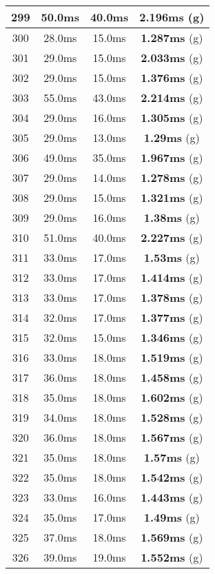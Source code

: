 \begin{table}[H]
\begin{minipage}{5cm}
{\begin{tabular}{|c|c|c|c|}
\hline
299 & 50.0ms & 40.0ms & \textbf{2.196ms} (g) \\
\hline
300 & 28.0ms & 15.0ms & \textbf{1.287ms} (g) \\
\hline
301 & 29.0ms & 15.0ms & \textbf{2.033ms} (g) \\
\hline
302 & 29.0ms & 15.0ms & \textbf{1.376ms} (g) \\
\hline
303 & 55.0ms & 43.0ms & \textbf{2.214ms} (g) \\
\hline
304 & 29.0ms & 16.0ms & \textbf{1.305ms} (g) \\
\hline
305 & 29.0ms & 13.0ms & \textbf{1.29ms} (g) \\
\hline
306 & 49.0ms & 35.0ms & \textbf{1.967ms} (g) \\
\hline
307 & 29.0ms & 14.0ms & \textbf{1.278ms} (g) \\
\hline
308 & 29.0ms & 15.0ms & \textbf{1.321ms} (g) \\
\hline
309 & 29.0ms & 16.0ms & \textbf{1.38ms} (g) \\
\hline
310 & 51.0ms & 40.0ms & \textbf{2.227ms} (g) \\
\hline
311 & 33.0ms & 17.0ms & \textbf{1.53ms} (g) \\
\hline
312 & 33.0ms & 17.0ms & \textbf{1.414ms} (g) \\
\hline
313 & 33.0ms & 17.0ms & \textbf{1.378ms} (g) \\
\hline
314 & 32.0ms & 17.0ms & \textbf{1.377ms} (g) \\
\hline
315 & 32.0ms & 15.0ms & \textbf{1.346ms} (g) \\
\hline
316 & 33.0ms & 18.0ms & \textbf{1.519ms} (g) \\
\hline
317 & 36.0ms & 18.0ms & \textbf{1.458ms} (g) \\
\hline
318 & 35.0ms & 18.0ms & \textbf{1.602ms} (g) \\
\hline
319 & 34.0ms & 18.0ms & \textbf{1.528ms} (g) \\
\hline
320 & 36.0ms & 18.0ms & \textbf{1.567ms} (g) \\
\hline
321 & 35.0ms & 18.0ms & \textbf{1.57ms} (g) \\
\hline
322 & 35.0ms & 18.0ms & \textbf{1.542ms} (g) \\
\hline
323 & 33.0ms & 16.0ms & \textbf{1.443ms} (g) \\
\hline
324 & 35.0ms & 17.0ms & \textbf{1.49ms} (g) \\
\hline
325 & 37.0ms & 18.0ms & \textbf{1.569ms} (g) \\
\hline
326 & 39.0ms & 19.0ms & \textbf{1.552ms} (g) \\

\end{tabular}}
\end{minipage}
\end{table}

